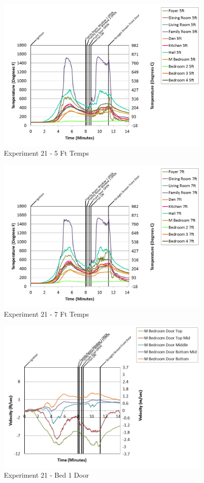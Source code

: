 \documentclass{article}
\begin{document}
\begin{appendices}
\begin{figure}[h!]
	\centering
	\includegraphics[height=3.05in]{0_Images/Results_Charts/Exp_21_Charts/5FtTemps.png}
	\caption{Experiment 21 - 5 Ft Temps}
\end{figure}


\begin{figure}[h!]
	\centering
	\includegraphics[height=3.05in]{0_Images/Results_Charts/Exp_21_Charts/7FtTemps.png}
	\caption{Experiment 21 - 7 Ft Temps}
\end{figure}

\clearpage

\begin{figure}[h!]
	\centering
	\includegraphics[height=3.05in]{0_Images/Results_Charts/Exp_21_Charts/Bed1Door.png}
	\caption{Experiment 21 - Bed 1 Door}
\end{figure}



\end{appendices}
\end{document}
